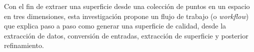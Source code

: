 Con el fin de extraer una superficie desde una colección de puntos en un espacio en tres dimensiones, esta investigación propone un flujo de trabajo (o \emph{workflow}) que explica paso a paso como generar una superficie de calidad, desde la extracción de datos, conversión de entradas, extracción de superficie y posterior refinamiento.